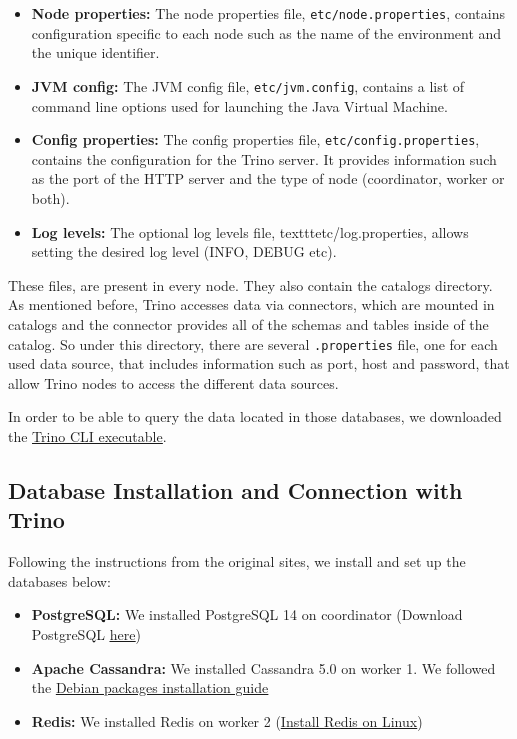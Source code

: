 \documentclass[conference]{IEEEtran}
\begin{document}
\begin{itemize}
    \item \textbf{Node properties:} The node properties file, \texttt{etc/node.properties}, contains configuration specific to each node such as the name of the environment and the unique identifier.
    \item \textbf{JVM config:} The JVM config file, \texttt{etc/jvm.config}, contains a list of command line options used for launching the Java Virtual Machine. 
    \item \textbf{Config properties:} The config properties file, \texttt{etc/config.properties}, contains the configuration for the Trino server. It provides information such as the port of the HTTP server and the type of node (coordinator, worker or both). 
    \item \textbf{Log levels:} The optional log levels file, texttt{etc/log.properties}, allows setting the desired log level (INFO, DEBUG etc).
\end{itemize}

These files, are present in every node. They also contain the catalogs directory. As mentioned before, Trino accesses data via connectors, which are mounted in catalogs and the connector provides all 
of the schemas and tables inside of the catalog. So under this directory, there are several \texttt{.properties} file, one for each used data source, that includes information such as port, host and password, 
that allow Trino nodes to access the different data sources.

In order to be able to query the data located in those databases, we downloaded the \textcolor{linkblue}{\underline{\href{https://trino.io/docs/current/client/cli.html}{Trino CLI executable}}}.

\subsection{Database Installation and Connection with Trino}

Following the instructions from the original sites, we install and set up the databases below:

\begin{itemize}
    \item \textbf{PostgreSQL:} We installed PostgreSQL 14 on coordinator (Download PostgreSQL \textcolor{linkblue}{\underline{\href{https://www.postgresql.org/download/}{here}}})
    \item \textbf{Apache Cassandra:} We installed Cassandra 5.0 on worker 1. We followed the \textcolor{linkblue}{\underline{\href{https://cassandra.apache.org/doc/stable/cassandra/getting_started/installing.html}{Debian packages installation guide}}}
    \item \textbf{Redis:} We installed Redis on worker 2 (\textcolor{linkblue}{\underline{\href{https://redis.io/docs/install/install-redis/install-redis-on-linux/}{Install Redis on Linux}}})
\end{itemize}
\end{document}
